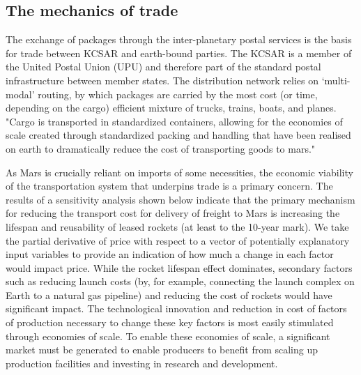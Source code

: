 \documentclass[fleqn,10pt]{Stylesheet} %
\begin{document}
\subsection{The mechanics of trade}

The exchange of packages through the inter-planetary postal services is the basis for trade between KCSAR and earth-bound parties. The KCSAR is a member of the United Postal Union (UPU) and therefore part of the standard postal infrastructure between member states. The distribution network relies on ‘multi-modal’ routing, by which packages are carried by the most cost (or time, depending on the cargo) efficient mixture of trucks, trains, boats, and planes. "Cargo is transported in standardized containers, allowing for the economies of scale created through standardized packing and handling that have been realised on earth to dramatically reduce the cost of transporting goods to mars." \cite{Levinson}

As Mars is crucially reliant on imports of some necessities, the economic viability of the transportation system that underpins trade is a primary concern. The results of a sensitivity analysis shown below indicate that the primary mechanism for reducing the transport cost for delivery of freight to Mars is increasing the lifespan and reusability of leased rockets (at least to the 10-year mark). We take the partial derivative of price with respect to a vector of potentially explanatory input variables to provide an indication of how much a change in each factor would impact price. While the rocket lifespan effect dominates, secondary factors such as reducing launch costs (by, for example, connecting the launch complex on Earth to a natural gas pipeline) and reducing the cost of rockets would have significant impact. The technological innovation and reduction in cost of factors of production necessary to change these key factors is most easily stimulated through economies of scale. To enable these economies of scale, a significant market must be generated to enable producers to benefit from scaling up production facilities and investing in research and development.
\end{document}
